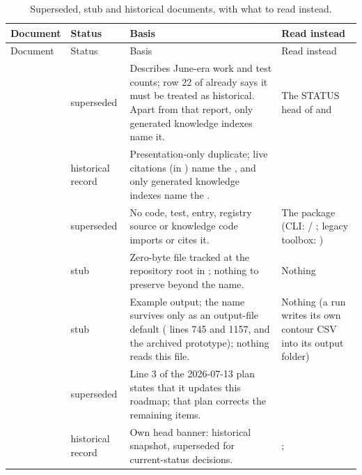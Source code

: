 {\footnotesize
\begin{longtable}{@{}P{4.6cm}P{1.6cm}P{5.0cm}P{4.4cm}@{}}
\caption{Superseded, stub and historical documents, with what to read instead.}\label{tab:inv-sup}\\
\toprule
Document & Status & Basis & Read instead \\
\midrule
\endfirsthead
\toprule
Document & Status & Basis & Read instead \\
\midrule
\endhead
\bottomrule
\endlastfoot
{} & superseded & Describes June-era work and test counts; row 22 of  already says it must be treated as historical. Apart from that report, only generated knowledge indexes name it. & The STATUS head of  and  \\
 & historical record & Presentation-only duplicate; live citations (in ) name the , and only generated knowledge indexes name the . &  \\
 & superseded & No code, test,  entry, registry source or knowledge code imports or cites it. & The  package (CLI:  / ; legacy toolbox: ) \\
 & stub & Zero-byte file tracked at the repository root in ; nothing to preserve beyond the name. & Nothing \\
 & stub & Example output; the name survives only as an output-file default ( lines 745 and 1157, and the archived prototype); nothing reads this file. & Nothing (a run writes its own contour CSV into its output folder) \\
\midrule
{} & superseded & Line 3 of the 2026-07-13 plan states that it updates this roadmap; that plan corrects the remaining items. &  \\
 & historical record & Own head banner: historical snapshot, superseded for current-status decisions. & ;  \\

\end{longtable}}
